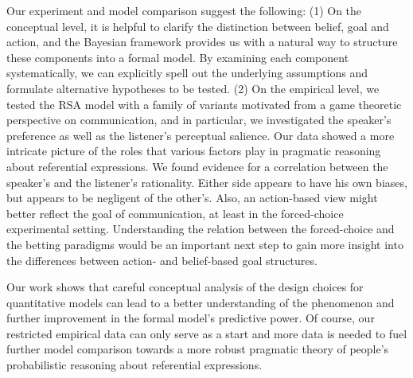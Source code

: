 Our experiment and model comparison suggest the following: (1) On the
conceptual level, it is helpful to clarify the distinction between
belief, goal and action, and the Bayesian framework provides us with a
natural way to structure these components into a formal model. By
examining each component systematically, we can explicitly spell out
the underlying assumptions and formulate alternative hypotheses to be
tested. (2) On the empirical level, we tested the RSA model with a
family of variants motivated from a game theoretic perspective on
communication, and in particular, we investigated the speaker's
preference as well as the listener's perceptual salience. Our data
showed a more intricate picture of the roles that various factors play
in pragmatic reasoning about referential expressions. We found
evidence for a correlation between the speaker's and the listener's
rationality. Either side appears to have his own biases, but appears
to be negligent of the other's. Also, an action-based view might
better reflect the goal of communication, at least in the
forced-choice experimental setting. Understanding the relation between
the forced-choice and the betting paradigms would be an important next
step to gain more insight into the differences between action- and
belief-based goal structures.

Our work shows that careful conceptual analysis of the design choices
for quantitative models can lead to a better understanding of the
phenomenon and further improvement in the formal model's predictive
power. Of course, our restricted empirical data can only serve as a
start and more data is needed to fuel further model comparison towards
a more robust pragmatic theory of people's probabilistic reasoning
about referential expressions.

